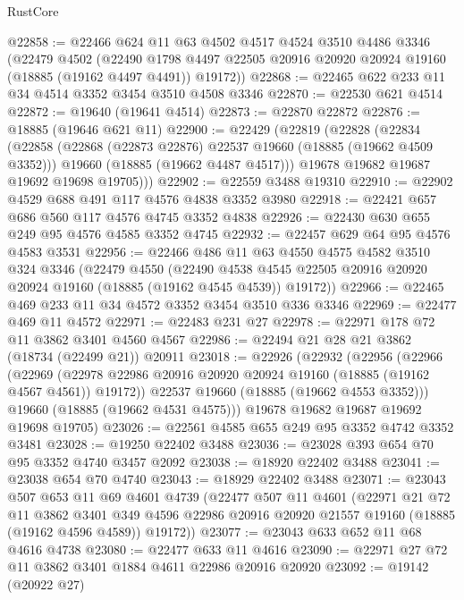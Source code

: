 \begin{lexlean}{RustCore}
\begin{coremodule}
@22858 := @22466
    @624
    @11
    @63
    @4502
    @4517
    @4524
    @3510
    @4486
    @3346
    (@22479
      @4502
      (@22490 @1798 @4497 @22505 @20916 @20920 @20924 @19160 (@18885 (@19162 @4497 @4491)) @19172))
@22868 := @22465 @622 @233 @11 @34 @4514 @3352 @3454 @3510 @4508 @3346
@22870 := @22530 @621 @4514
@22872 := @19640 (@19641 @4514)
@22873 := @22870 @22872
@22876 := @18885 (@19646 @621 @11)
@22900 := @22429
    (@22819
      (@22828
        (@22834
          (@22858
            (@22868 (@22873 @22876) @22537 @19660 (@18885 (@19662 @4509 @3352)))
            @19660
            (@18885 (@19662 @4487 @4517)))
          @19678
          @19682
          @19687
          @19692
          @19698
          @19705)))
@22902 := @22559 @3488 @19310
@22910 := @22902 @4529 @688 @491 @117 @4576 @4838 @3352 @3980
@22918 := @22421 @657 @686 @560 @117 @4576 @4745 @3352 @4838
@22926 := @22430 @630 @655 @249 @95 @4576 @4585 @3352 @4745
@22932 := @22457 @629 @64 @95 @4576 @4583 @3531
@22956 := @22466
    @486
    @11
    @63
    @4550
    @4575
    @4582
    @3510
    @324
    @3346
    (@22479
      @4550
      (@22490 @4538 @4545 @22505 @20916 @20920 @20924 @19160 (@18885 (@19162 @4545 @4539)) @19172))
@22966 := @22465 @469 @233 @11 @34 @4572 @3352 @3454 @3510 @336 @3346
@22969 := @22477 @469 @11 @4572
@22971 := @22483 @231 @27
@22978 := @22971 @178 @72 @11 @3862 @3401 @4560 @4567
@22986 := @22494 @21 @28 @21 @3862 (@18734 (@22499 @21)) @20911
@23018 := @22926
    (@22932
      (@22956
        (@22966
          (@22969 (@22978 @22986 @20916 @20920 @20924 @19160 (@18885 (@19162 @4567 @4561)) @19172))
          @22537
          @19660
          (@18885 (@19662 @4553 @3352)))
        @19660
        (@18885 (@19662 @4531 @4575)))
      @19678
      @19682
      @19687
      @19692
      @19698
      @19705)
@23026 := @22561 @4585 @655 @249 @95 @3352 @4742 @3352 @3481
@23028 := @19250 @22402 @3488
@23036 := @23028 @393 @654 @70 @95 @3352 @4740 @3457 @2092
@23038 := @18920 @22402 @3488
@23041 := @23038 @654 @70 @4740
@23043 := @18929 @22402 @3488
@23071 := @23043
    @507
    @653
    @11
    @69
    @4601
    @4739
    (@22477
      @507
      @11
      @4601
      (@22971
        @21
        @72
        @11
        @3862
        @3401
        @349
        @4596
        @22986
        @20916
        @20920
        @21557
        @19160
        (@18885 (@19162 @4596 @4589))
        @19172))
@23077 := @23043 @633 @652 @11 @68 @4616 @4738
@23080 := @22477 @633 @11 @4616
@23090 := @22971 @27 @72 @11 @3862 @3401 @1884 @4611 @22986 @20916 @20920
@23092 := @19142 (@20922 @27)

\end{coremodule}
\end{lexlean}
